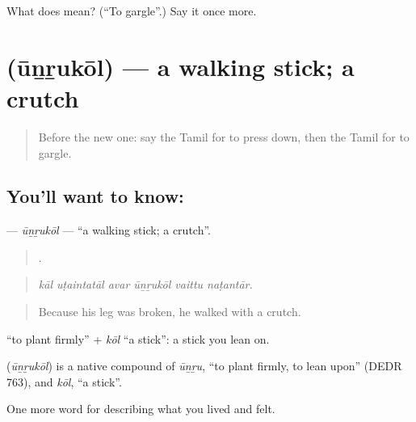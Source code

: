 \begin{tcolorbox}[breakable,colback=teal!4,colframe=teal!35!black,title={Before you move on}]
What does  mean? (\textquotedblleft{}To gargle\textquotedblright{}.) Say it once more.
\end{tcolorbox}
\section[\texorpdfstring{\ta{ஊன்றுகோல்} (ūṉṟukōl)}{ஊன்றுகோல் (ūṉṟukōl)}]{ (ūṉṟukōl) — a walking stick; a crutch}

\label{lesson:TA-C486-unrukol}



\begin{quote}
Before the new one: say the Tamil for to press down, then the Tamil for to gargle.
\end{quote}

\subsection*{You'll want to know: }
\textbf{} — \emph{ūṉṟukōl} — \textquotedblleft{}a walking stick; a crutch\textquotedblright{}.

\begin{quote}
     .
\end{quote}

\begin{quote}
\emph{kāl uṭaintatāl avar ūṉṟukōl vaittu naṭantār.}
\end{quote}

\begin{quote}
Because his leg was broken, he walked with a crutch.
\end{quote}

 \textquotedblleft{}to plant firmly\textquotedblright{} + \emph{kōl} \textquotedblleft{}a stick\textquotedblright{}: a stick you lean on.

\begin{cousinweb}
\textbf{} (\emph{ūṉṟukōl}) is a native compound of  \emph{ūṉṟu}, \textquotedblleft{}to plant firmly, to lean upon\textquotedblright{} (DEDR 763), and \emph{kōl}, \textquotedblleft{}a stick\textquotedblright{}.
\end{cousinweb}

\begin{grammarlens}[title={What you've built}]
One more word for describing what you lived and felt.
\end{grammarlens}

